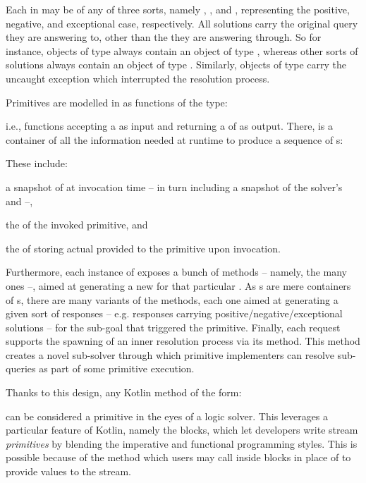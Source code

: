 \documentclass[12pt,a4paper,openright,twoside]{book}
\begin{document}
Each  in \twopkt{} may be of any of three sorts, namely , \mbox{,} and , representing the positive, negative, and exceptional case, respectively.
%
All solutions carry the original query they are answering to, other than the  they are answering through.
%
So for instance, objects of type  always contain an object of type , whereas other sorts of solutions always contain an object of type .
%
Similarly, objects of type  carry the uncaught exception which interrupted the resolution process.

Primitives are modelled in \twopkt{} as functions of the type:
%

%
i.e., functions accepting a  as input and returning a  of  as output.
%
There,  is a container of all the information needed at runtime to produce a sequence of s:
%

%
These include:
%
\begin{inlinelist}
    \item a snapshot of  at invocation time -- in turn including a snapshot of the solver's  and  --,
    \item the  of the invoked primitive, and
    \item the  of  storing actual  provided to the primitive upon invocation.
\end{inlinelist}
%
Furthermore, each instance of  exposes a bunch of methods -- namely, the many  ones --, aimed at generating a new  for that particular .
%
As s are mere containers of s, there are many variants of the  methods, each one aimed at generating a given sort of responses -- e.g. responses carrying positive/negative/exceptional solutions -- for the sub-goal that triggered the primitive.
%
Finally, each request supports the spawning of an inner resolution process via its  method.
%
This method creates a novel sub-solver through which primitive implementers can resolve sub-queries as part of some primitive execution.

Thanks to this design, any Kotlin method of the form:
%

%
can be considered a primitive in the eyes of a logic solver.
%
This leverages a particular feature of Kotlin, namely the  blocks, which let developers write stream \emph{primitives} by blending the imperative and functional programming styles.
%
This is possible because of the  method which users may call inside  blocks in place of  to provide values to the stream.
\end{document}
